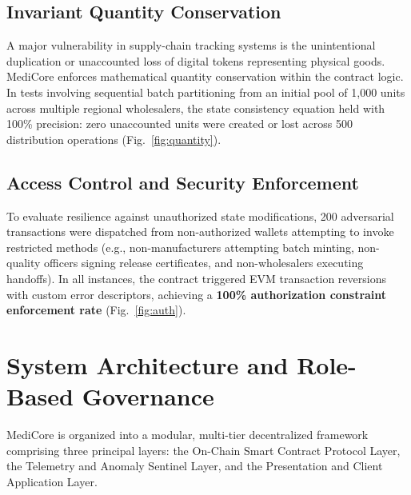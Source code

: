\documentclass[pdflatex,sn-mathphys-num]{sn-jnl}
\theoremstyle{thmstyleone}
\theoremstyle{thmstyletwo}
\theoremstyle{thmstylethree}
\begin{document}
\subsection{Invariant Quantity Conservation}\label{sec2.3}
A major vulnerability in supply-chain tracking systems is the unintentional duplication or unaccounted loss of digital tokens representing physical goods. MediCore enforces mathematical quantity conservation within the contract logic. In tests involving sequential batch partitioning from an initial pool of 1,000 units across multiple regional wholesalers, the state consistency equation held with 100\% precision: zero unaccounted units were created or lost across 500 distribution operations (Fig.~\ref{fig:quantity}).

\subsection{Access Control and Security Enforcement}\label{sec2.4}
To evaluate resilience against unauthorized state modifications, 200 adversarial transactions were dispatched from non-authorized wallets attempting to invoke restricted methods (e.g., non-manufacturers attempting batch minting, non-quality officers signing release certificates, and non-wholesalers executing handoffs). In all instances, the contract triggered EVM transaction reversions with custom error descriptors, achieving a \textbf{100\% authorization constraint enforcement rate} (Fig.~\ref{fig:auth}).

\section{System Architecture and Role-Based Governance}\label{sec3}

MediCore is organized into a modular, multi-tier decentralized framework comprising three principal layers: the On-Chain Smart Contract Protocol Layer, the Telemetry and Anomaly Sentinel Layer, and the Presentation and Client Application Layer.
\end{document}
